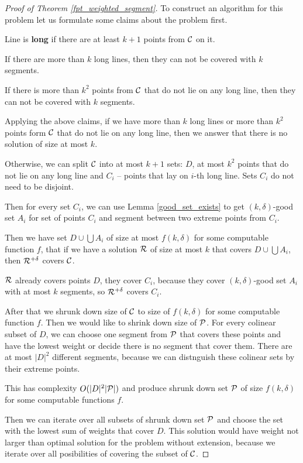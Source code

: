 \begin{proof}[Proof of Theorem \ref{fpt_weighted_segment}]

To construct an algorithm for this problem let us formulate
some claims about the problem first.

\begin{defi}
Line is \textbf{long} if there are at least $k+1$ points from $\mathcal{C}$ on it.
\end{defi}

\begin{claim}
If there are more than $k$ long lines, then 
they can not be covered with $k$ segments.
\end{claim}

\begin{claim}
If there is more than $k^2$ points from $\mathcal{C}$
that do not lie on any long line, then they can not be covered with $k$ segments.
\end{claim}

Applying the above claims, if we have more than $k$ long lines
or more than $k^2$ points form $\mathcal{C}$
that do not lie on any long line, then we answer that
there is no solution of size at most $k$.

Otherwise, we can split $\mathcal{C}$ into at most $k+1$ sets:
$D$, at most $k^2$ points that do not lie on any long line
and $C_i$ -- points
that lay on $i$-th long line.
Sets $C_i$ do not need to be disjoint.

Then for every set $C_i$, we can use Lemma \ref{good_set_exists}
to get $(k,\delta)$-good set $A_i$
for set of points $C_i$ and segment between two extreme points from $C_i$.

Then we have set $D \cup \bigcup A_i$ of size at most $f(k, \delta)$
for some computable function $f$, that if we have a solution $\mathcal{R}$ of size at most $k$
that covers $D \cup \bigcup A_i$, then $\mathcal{R}^{+\delta}$ covers $\mathcal{C}$.

$\mathcal{R}$ already covers points $D$, they cover $C_i$, because
they cover $(k,\delta)$-good set $A_i$ with at most $k$ segments,
so $\mathcal{R}^{+\delta}$ covers $C_i$.

After that we shrunk down size of $\mathcal{C}$ to size of $f(k, \delta)$
for some computable function $f$.
Then we would like to shrink down size of $\mathcal{P}$.
For every colinear subset of $D$, we can choose one segment from
$\mathcal{P}$ that covers these points and have the lowest weight
or decide there is no segment that cover them.
There are at most $|D|^2$ different segments, because
we can distnguish these colinear sets by their extreme points.

This has complexity $O(|D|^2|\mathcal{P}|)$ and produce shrunk down
set $\mathcal{P}$ of size $f(k, \delta)$ for some computable functions $f$.

Then we can iterate over all subsets of shrunk down set $\mathcal{P}$ and
choose the set with the lowest sum of weights that cover $D$. This solution
would have weight not larger than optimal solution
for the problem without extension, because we iterate
over all posibilities of covering the subset of $\mathcal{C}$.

\end{proof}

